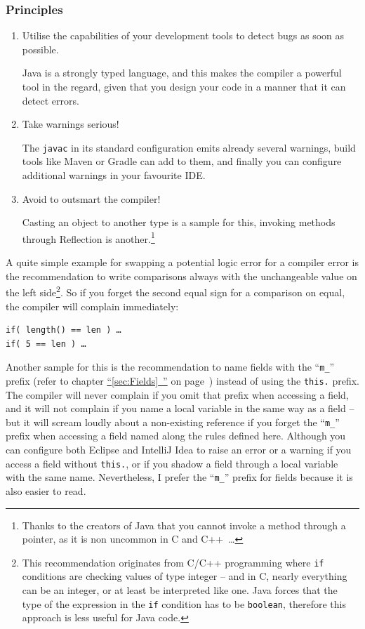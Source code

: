 \documentclass[11pt,a4paper, titlepage, parskip=half, headsepline, footsepline, cleardoublepage=current, headheight=1cm]{scrbook}
\newcommand*{\tqfullvref}[1]{\hyperref[{#1}]{“\ref*{#1}~\nameref*{#1}”} on page~\pageref{#1}}
\begin{document}
\subsubsection{Principles}
\begin{enumerate}[label=P\arabic*.]
\item{Utilise the capabilities of your development tools to detect bugs as soon as possible.

Java is a strongly typed language, and this makes the compiler a powerful tool in the regard, given that you design your code in a manner that it can detect errors.}

\item{Take warnings serious!

The \verb#javac# in its standard configuration emits already several warnings, build tools like Maven\autocite{APACHE_MAVEN} or Gradle\autocite{GRADLE} can add to them, and finally you can configure additional warnings in your favourite IDE.}

\item{Avoid to outsmart the compiler!

Casting an object to another type is a sample for this, invoking methods through Reflection is another.\footnote{Thanks to the creators of Java that you cannot invoke a method through a pointer, as it is non uncommon in C and C++~…}}
\end{enumerate}

A quite simple example for swapping a potential logic error for a compiler error is the recommendation to write comparisons always with the unchangeable value on the left side\footnote{This recommendation originates from C/C++ programming where \lstinline|if| conditions are checking values of type integer – and in C, nearly everything can be an integer, or at least be interpreted like one. Java forces that the type of the expression in the \lstinline|if| condition has to be \lstinline|boolean|, therefore this approach is less useful for Java code.}. So if you forget the second equal sign for a comparison on equal, the compiler will complain immediately:
\begin{lstlisting}
if( length() == len ) …
if( 5 == len ) …
\end{lstlisting}

Another sample for this is the recommendation to name fields with the “\verb#m_#” prefix (refer to chapter \tqfullvref{sec:Fields}) instead of using the \lstinline|this.| prefix. The compiler will never complain if you omit that prefix when accessing a field, and it will not complain if you name a local variable in the same way as a field – but it will scream loudly about a non-existing reference if you forget the “\verb#m_#” prefix when accessing a field named along the rules defined here. Although you can configure both Eclipse and IntelliJ Idea to raise an error or a warning if you access a field without \lstinline|this.|, or if you shadow a field through a local variable with the same name. Nevertheless, I prefer the “\verb#m_#” prefix for fields because it is also easier to read.
\end{document}
